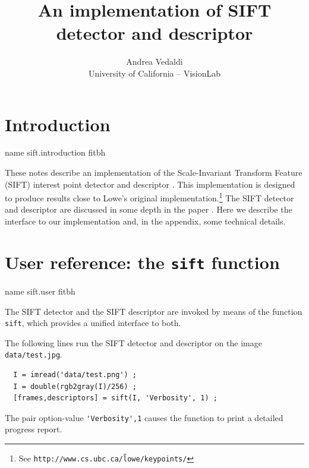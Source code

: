\documentclass{article}
\title{An implementation of SIFT detector and descriptor}
\author{Andrea Vedaldi\\ University of California -- VisionLab}
\date{}
\let\oldtt=\tt
\renewcommand{\tt}{\oldtt\color{codecolor}}
\begin{document}
\maketitle{}

\let\oldlabel=\label
\renewcommand{\label}[1]{%
{\pdfdest name {#1} fitbh}%
\oldlabel{#1}%
}

\tableofcontents{}

\section{Introduction}\label{sift.introduction}

These notes describe an implementation of the Scale-Invariant Transform Feature (SIFT) interest point detector and descriptor \cite{lowe04distinctive}. This implementation is designed to produce results close to Lowe's original implementation.\footnote{See {\tt http://www.cs.ubc.ca/\~ lowe/keypoints/}} The SIFT detector and descriptor are discussed in some depth in the paper  \cite{lowe04distinctive}. Here we describe the interface to our implementation and, in the appendix, some technical details.

\section{User reference: the {\tt sift} function}\label{sift.user}

The SIFT detector and the SIFT descriptor are invoked by means of the function {\tt sift}, which provides a unified interface to both.

\begin{example}[Invocation]
The following lines run the SIFT detector and descriptor on the image {\tt data/test.jpg}.
\begin{verbatim}
  I = imread('data/test.png') ;
  I = double(rgb2gray(I)/256) ;
  [frames,descriptors] = sift(I, 'Verbosity', 1) ;
\end{verbatim}
The pair option-value \verb$'Verbosity',1$ causes the function to print a detailed progress report.
\end{example}
\end{document}
